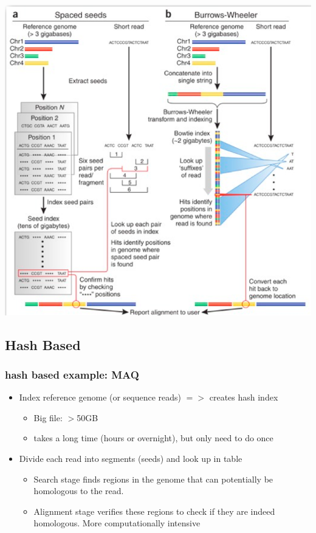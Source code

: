 \documentclass[pdf]{beamer}
\begin{document}
\begin{frame}
\begin{center}
\includegraphics[scale=.32]{Figures/hashVsBW.png} 
\end{center}
\end{frame}

\subsection{Hash Based}
\begin{frame}
  \frametitle{hash based example: MAQ}
  \begin{itemize}
  \item  Index reference genome (or sequence reads) $=>$ creates hash index       
  \begin{itemize}
   \item Big file: $>$50GB 
   \item takes a long time (hours or overnight), but only need to do once
  \end{itemize}
  \item Divide each read into segments (seeds) and look up in table
  \begin{itemize}
  \item Search stage finds regions in the genome that can potentially be homologous to the read. 
  \item Alignment stage verifies these regions to check if they are indeed homologous. More computationally intensive
  \end{itemize}
  \end{itemize}
\end{frame}
\end{document}
